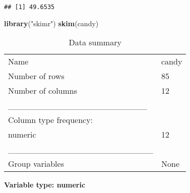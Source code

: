 \documentclass[
]{article}
\newenvironment{Shaded}{\begin{snugshade}}{\end{snugshade}}
\newcommand{\FunctionTok}[1]{\textcolor[rgb]{0.13,0.29,0.53}{\textbf{#1}}}
\newcommand{\NormalTok}[1]{#1}
\newcommand{\SpecialCharTok}[1]{\textcolor[rgb]{0.81,0.36,0.00}{\textbf{#1}}}
\newcommand{\StringTok}[1]{\textcolor[rgb]{0.31,0.60,0.02}{#1}}
\begin{document}
\begin{Shaded}
\end{Shaded}

\begin{verbatim}
## [1] 49.6535
\end{verbatim}

\begin{Shaded}
\begin{Highlighting}[]
\FunctionTok{library}\NormalTok{(}\StringTok{"skimr"}\NormalTok{)}
\FunctionTok{skim}\NormalTok{(candy)}
\end{Highlighting}
\end{Shaded}

\begin{longtable}[]{@{}ll@{}}
\caption{Data summary}\tabularnewline
\toprule\noalign{}
\endfirsthead
\endhead
\bottomrule\noalign{}
\endlastfoot
Name & candy \\
Number of rows & 85 \\
Number of columns & 12 \\
\_\_\_\_\_\_\_\_\_\_\_\_\_\_\_\_\_\_\_\_\_\_\_ & \\
Column type frequency: & \\
numeric & 12 \\
\_\_\_\_\_\_\_\_\_\_\_\_\_\_\_\_\_\_\_\_\_\_\_\_ & \\
Group variables & None \\
\end{longtable}

\textbf{Variable type: numeric}
\end{document}
